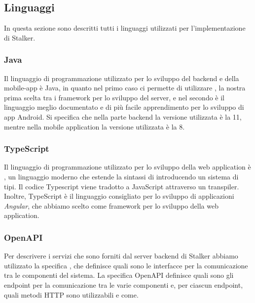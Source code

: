 \documentclass[../../manuale-manutentore.tex]{subfiles}
\begin{document}
\subsection{Linguaggi}%
\label{sub:linguaggi}
In questa sezione sono descritti tutti i linguaggi utilizzati per l'implementazione di Stalker.

\subsubsection{Java}%
\label{subs:java}

Il linguaggio di programmazione utilizzato per lo sviluppo del backend e della mobile-app è Java, in quanto nel primo caso ci permette di utilizzare , la nostra prima scelta tra i framework per lo sviluppo del server, e nel secondo è il linguaggio meglio documentato e di più facile apprendimento per lo sviluppo di app Android.
Si specifica che nella parte backend la versione utilizzata è la 11, mentre nella mobile application la versione utilizzata è la 8.

\subsubsection{TypeScript}%
\label{subs:typescript}

Il linguaggio di programmazione utilizzato per lo sviluppo della web application è , un linguaggio moderno che estende la sintassi di  introducendo un sistema di tipi.
Il codice Typescript viene tradotto a JavaScript attraverso un transpiler.
Inoltre, TypeScript è il linguaggio consigliato per lo sviluppo di applicazioni \textit{Angular}, che abbiamo scelto come framework per lo sviluppo della web application.

\subsubsection{OpenAPI}%
\label{subs:openapi}

Per descrivere i servizi che sono forniti dal server backend di Stalker abbiamo utilizzato la specifica , che definisce quali sono le interfacce per la comunicazione tra le componenti del sistema.
La specifica OpenAPI definisce quali sono gli endpoint per la comunicazione tra le varie componenti e, per ciascun endpoint, quali metodi HTTP sono utilizzabili e come\@.
\end{document}
